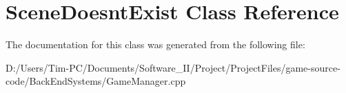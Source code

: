 \hypertarget{class_scene_doesnt_exist}{}\section{Scene\+Doesnt\+Exist Class Reference}
\label{class_scene_doesnt_exist}


The documentation for this class was generated from the following file\+:\begin{DoxyCompactItemize}
\item 
D\+:/\+Users/\+Tim-\/\+P\+C/\+Documents/\+Software\+\_\+\+I\+I/\+Project/\+Project\+Files/game-\/source-\/code/\+Back\+End\+Systems/Game\+Manager.\+cpp\end{DoxyCompactItemize}
